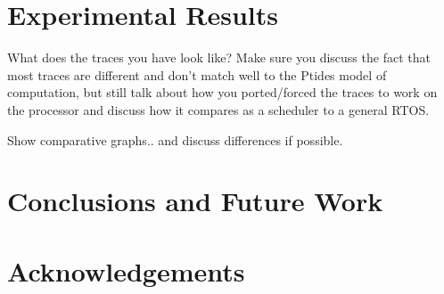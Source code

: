 \documentclass{sig-alternate}
\begin{document}
\section{Experimental Results}
What does the traces you have look like? Make sure you discuss the fact that most traces are different and don't match well to the Ptides model of computation, but still talk about how you ported/forced the traces to work on the processor and discuss how it compares as a scheduler to a general RTOS.

Show comparative graphs.. and discuss differences if possible.



\section{Conclusions and Future Work}
\label{scfw}
\section{Acknowledgements}

 


 
\end{document}
